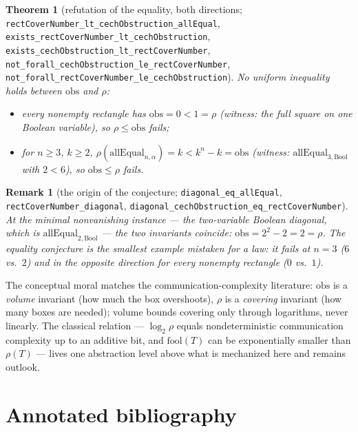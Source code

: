 \documentclass[11pt]{article}
\newtheorem{theorem}{Theorem}
\newtheorem{remark}{Remark}
\newcommand{\ste}[1]{\texttt{#1}}
\begin{document}
\begin{theorem}[refutation of the equality, both directions;
\ste{rectCoverNumber\_lt\_cechObstruction\_allEqual},
\ste{exists\_rectCoverNumber\_lt\_cechObstruction},
\ste{exists\_cechObstruction\_lt\_rectCoverNumber},
\ste{not\_forall\_cechObstruction\_le\_rectCoverNumber},
\ste{not\_forall\_rectCoverNumber\_le\_cechObstruction}]
No uniform inequality holds between $\mathrm{obs}$ and $\rho$:
\begin{itemize}
\item every nonempty rectangle has $\mathrm{obs}=0<1=\rho$ (witness:
the full square on one Boolean variable), so
$\rho\le\mathrm{obs}$ fails;
\item for $n\ge3$, $k\ge2$,
$\rho(\mathrm{allEqual}_{n,\alpha})=k<k^n-k=\mathrm{obs}$ (witness:
$\mathrm{allEqual}_{3,\mathrm{Bool}}$ with $2<6$), so
$\mathrm{obs}\le\rho$ fails.
\end{itemize}
\end{theorem}

\begin{remark}[the origin of the conjecture;
\ste{diagonal\_eq\_allEqual}, \ste{rectCoverNumber\_diagonal},
\ste{diagonal\_cechObstruction\_eq\_rectCoverNumber}]
At the minimal nonvanishing instance --- the two-variable Boolean
diagonal, which is $\mathrm{allEqual}_{2,\mathrm{Bool}}$ --- the two
invariants \emph{coincide}: $\mathrm{obs}=2^2-2=2=\rho$. The equality
conjecture is the smallest example mistaken for a law: it fails at
$n=3$ ($6$ vs.\ $2$) and in the opposite direction for every nonempty
rectangle ($0$ vs.\ $1$).
\end{remark}

The conceptual moral matches the communication-complexity literature:
$\mathrm{obs}$ is a \emph{volume} invariant (how much the box
overshoots), $\rho$ is a \emph{covering} invariant (how many boxes are
needed); volume bounds covering only through logarithms, never linearly.
The classical relation --- $\log_2\rho$ equals nondeterministic
communication complexity up to an additive bit, and
$\mathrm{fool}(T)$ can be exponentially smaller than $\rho(T)$
\citep{dietzfelbinger1996comparison} --- lives one abstraction level
above what is mechanized here and remains outlook.

\section{Annotated bibliography}
\end{document}
